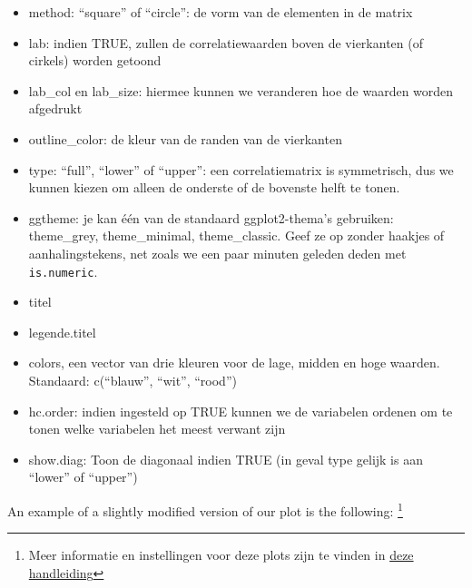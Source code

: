\documentclass[]{tufte-book}
\newenvironment{Shaded}{}{}
\newcommand{\DataTypeTok}[1]{\textcolor[rgb]{0.56,0.13,0.00}{#1}}
\newcommand{\DecValTok}[1]{\textcolor[rgb]{0.25,0.63,0.44}{#1}}
\newcommand{\KeywordTok}[1]{\textcolor[rgb]{0.00,0.44,0.13}{\textbf{#1}}}
\newcommand{\NormalTok}[1]{#1}
\newcommand{\OperatorTok}[1]{\textcolor[rgb]{0.40,0.40,0.40}{#1}}
\newcommand{\StringTok}[1]{\textcolor[rgb]{0.25,0.44,0.63}{#1}}
\providecommand{\tightlist}{%
  \setlength{\itemsep}{0pt}\setlength{\parskip}{0pt}}
\begin{document}
\begin{itemize}
\tightlist
\item
  method: ``square'' of ``circle'': de vorm van de elementen in de matrix
\item
  lab: indien TRUE, zullen de correlatiewaarden boven de vierkanten (of cirkels) worden getoond
\item
  lab\_col en lab\_size: hiermee kunnen we veranderen hoe de waarden worden afgedrukt
\item
  outline\_color: de kleur van de randen van de vierkanten
\item
  type: ``full'', ``lower'' of ``upper'': een correlatiematrix is symmetrisch, dus we kunnen kiezen om alleen de onderste of de bovenste helft te tonen.
\item
  ggtheme: je kan één van de standaard ggplot2-thema's gebruiken: theme\_grey, theme\_minimal, theme\_classic. Geef ze op zonder haakjes of aanhalingstekens, net zoals we een paar minuten geleden deden met \texttt{is.numeric}.
\item
  titel
\item
  legende.titel
\item
  colors, een vector van drie kleuren voor de lage, midden en hoge waarden. Standaard: c(``blauw'', ``wit'', ``rood'')
\item
  hc.order: indien ingesteld op TRUE kunnen we de variabelen ordenen om te tonen welke variabelen het meest verwant zijn
\item
  show.diag: Toon de diagonaal indien TRUE (in geval type gelijk is aan ``lower'' of ``upper'')
\end{itemize}

An example of a slightly modified version of our plot is the following: \footnote{Meer informatie en instellingen voor deze plots zijn te vinden in \href{https://github.com/kassambara/ggcorrplot}{deze handleiding}}

\begin{Shaded}
\end{Shaded}
\end{document}
